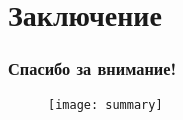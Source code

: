\section{Заключение}
\begin{frame}
    \frametitle{Спасибо за внимание!}
    \begin{figure}
        \begin{centering}
            \texttt{[image: summary]}
        \end{centering}
    \end{figure}
\end{frame}
